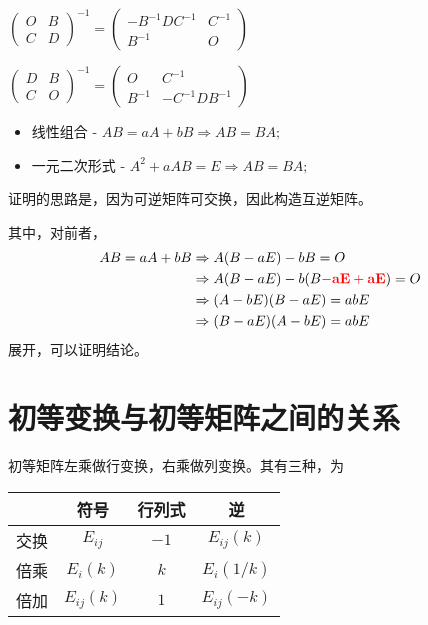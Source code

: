 \begin{itemize}
\begin{itemize}
        $ \begin{pmatrix}
        O & B \\ C & D
        \end{pmatrix}^{-1} = 
        \begin{pmatrix}
        -B^{-1}DC^{-1} & C^{-1} \\ B^{-1} & O
        \end{pmatrix} $ 
        
        $ \begin{pmatrix}
        D & B \\ C & O
        \end{pmatrix}^{-1} = 
        \begin{pmatrix}
        O & C^{-1} \\ B^{-1} & -C^{-1}DB^{-1}
        \end{pmatrix} $ 
    \end{itemize}
\end{itemize}


\begin{itemize}
    \item 线性组合 - $ AB = aA+bB \Rightarrow AB = BA; $ 
    \item 一元二次形式 - $ A^2 + aAB = E \Rightarrow AB = BA; $
\end{itemize}

证明的思路是，因为可逆矩阵可交换，因此构造互逆矩阵。

其中，对前者，
\begin{equation*}
    \begin{aligned}
        AB = aA + bB &\Rightarrow A(B-aE) - bB = O \\ 
        &\Rightarrow A(B-aE) - b(B\textcolor{red}{\bf{-aE+aE}}) = O \\ 
        &\Rightarrow (A-bE)(B-aE) = abE \\
        &\Rightarrow (B-aE)(A-bE) = abE
    \end{aligned}
\end{equation*}
展开，可以证明结论。

\section{初等变换与初等矩阵之间的关系}

初等矩阵左乘做行变换，右乘做列变换。其有三种，为

\begin{table}[!htbp]\centering
    \begin{tabular}{|c|c|c|c|}
    \hline
            &  符号  & 行列式 & 逆                \\ \hline
    交换&$ E_{ij} $    & $ -1 $   & $ E_{ij}(k) $       \\ \hline
    倍乘&$ E_{i}(k) $  & $ k  $   & $ E_{i}(1/k) $ \\ \hline
    倍加&$ E_{ij}(k) $ & $ 1  $   & $ E_{ij}(-k) $      \\ \hline
    \end{tabular}
\end{table}

